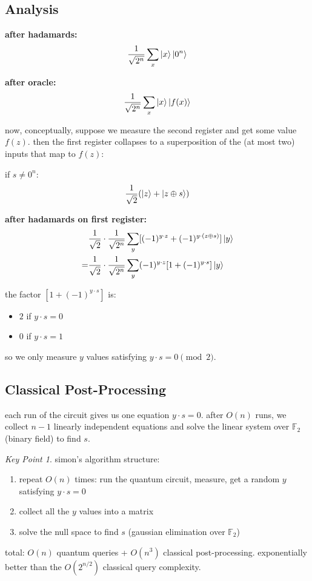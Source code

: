 \documentclass[11pt,a4paper]{article}
\theoremstyle{definition}
\theoremstyle{remark}
\newtheorem*{keypoint}{Key Point}
\begin{document}
\subsection{Analysis}

\textbf{after hadamards:}
\[
\frac{1}{\sqrt{2^n}}\sum_x \ket{x}\ket{0^n}
\]

\textbf{after oracle:}
\[
\frac{1}{\sqrt{2^n}}\sum_x \ket{x}\ket{f(x)}
\]

now, conceptually, suppose we measure the second register and get some value $f(z)$. then the first register collapses to a superposition of the (at most two) inputs that map to $f(z)$:

if $s \neq 0^n$:
\[
\frac{1}{\sqrt{2}}(\ket{z} + \ket{z \oplus s})
\]

\textbf{after hadamards on first register:}
\begin{align}
&\frac{1}{\sqrt{2}} \cdot \frac{1}{\sqrt{2^n}}\sum_y [(-1)^{y \cdot z} + (-1)^{y \cdot (z \oplus s)}]\ket{y} \\
= &\frac{1}{\sqrt{2}} \cdot \frac{1}{\sqrt{2^n}}\sum_y (-1)^{y \cdot z}[1 + (-1)^{y \cdot s}]\ket{y}
\end{align}

the factor $[1 + (-1)^{y \cdot s}]$ is:
\begin{itemize}
    \item $2$ if $y \cdot s = 0$
    \item $0$ if $y \cdot s = 1$
\end{itemize}

so we only measure $y$ values satisfying $\boxed{y \cdot s = 0 \pmod{2}}$.

\subsection{Classical Post-Processing}

each run of the circuit gives us one equation $y \cdot s = 0$. after $O(n)$ runs, we collect $n-1$ linearly independent equations and solve the linear system over $\mathbb{F}_2$ (binary field) to find $s$.

\begin{keypoint}
simon's algorithm structure:
\begin{enumerate}
    \item repeat $O(n)$ times: run the quantum circuit, measure, get a random $y$ satisfying $y \cdot s = 0$
    \item collect all the $y$ values into a matrix
    \item solve the null space to find $s$ (gaussian elimination over $\mathbb{F}_2$)
\end{enumerate}
total: $O(n)$ quantum queries + $O(n^3)$ classical post-processing. exponentially better than the $O(2^{n/2})$ classical query complexity.
\end{keypoint}
\end{document}
